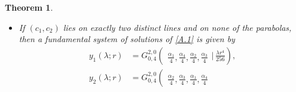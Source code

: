 \documentclass[reqno,11pt,centertags]{amsart}
\newcommand{\<}{\langle}
\renewcommand{\>}{\rangle}
\numberwithin{equation}{section}
\newtheorem{theorem}{Theorem}[section]
\theoremstyle{definition}
\def\d{\displaystyle}
\begin{document}
\begin{theorem}
\begin{itemize}
\begin{align}
\begin{array}{c}
\end{array} \bigg\vert\,  \frac{\lambda r^4}{256} \right), 
\end{align}
if $\d c_1>\frac{5}{4}- 8k^2$, and by 
\begin{align}
y_1(\lambda;r)&=G_{0,4}^{2,0}\left(\!\begin{array}{c}\\
{\frac{\alpha_1}{4},\frac{\alpha_2}{4}, \frac{\alpha_3}{4},\frac{\alpha_4}{4}}
\end{array} \bigg\vert\,   \frac{\lambda r^4}{256} \right),\\
y_2(\lambda;r)&=r^{\alpha_2} \,_{0} F_3\left(\!\begin{array}{c}\\
{ 1+\frac{\alpha_2-\alpha_1}{4}, 1+\frac{\alpha_2-\alpha_3}{4}, 1+\frac{\alpha_2-\alpha_4}{4}}
\end{array} \bigg\vert\,  \frac{\lambda r^4}{256} \right),\\
y_3(\lambda;r)&=G_{0,4}^{2,0}\left(\!\begin{array}{c}\\
{\frac{\alpha_3}{4},\frac{\alpha_4}{4}, \frac{\alpha_1}{4},\frac{\alpha_2}{4}}
\end{array} \bigg\vert\,   \frac{\lambda r^4}{256} \right),\\
y_4(\lambda;r)&=r^{\alpha_4} \,_{0} F_3\left(\!\begin{array}{c}\\
{ 1+\frac{\alpha_4-\alpha_1}{4}, 1+\frac{\alpha_4-\alpha_2}{4}, 1+\frac{\alpha_4-\alpha_3}{4}}
\end{array} \bigg\vert\,  \frac{\lambda r^4}{256} \right),
\end{align}
if $\d c_1<\frac{5}{4}- 8k^2$.     \\[1mm] 
\item[(c)] If $(c_1,c_2)$ lies on exactly two distinct lines and on none of the parabolas, then a fundamental system of solutions of \eqref{A.1} is given by 
\begin{align}
y_1(\lambda;r)&=G_{0,4}^{2,0}\left(\!\begin{array}{c}\\
{\frac{\alpha_1}{4},\frac{\alpha_4}{4}, \frac{\alpha_2}{4},\frac{\alpha_3}{4}}
\end{array} \bigg\vert\,   \frac{\lambda r^4}{256} \right),\\
y_2(\lambda;r)&=G_{0,4}^{2,0}\left(\!\begin{array}{c}\\
{\frac{\alpha_2}{4},\frac{\alpha_3}{4}, \frac{\alpha_1}{4},\frac{\alpha_4}{4}}

\end{array}
\end{align}
\end{itemize}
\end{theorem}
\end{document}
